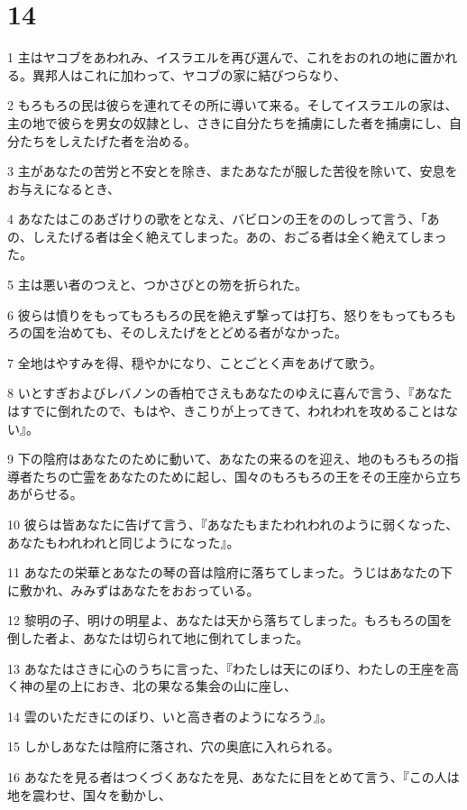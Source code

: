 \chapter{14}

\par 1 主はヤコブをあわれみ、イスラエルを再び選んで、これをおのれの地に置かれる。異邦人はこれに加わって、ヤコブの家に結びつらなり、
\par 2 もろもろの民は彼らを連れてその所に導いて来る。そしてイスラエルの家は、主の地で彼らを男女の奴隷とし、さきに自分たちを捕虜にした者を捕虜にし、自分たちをしえたげた者を治める。
\par 3 主があなたの苦労と不安とを除き、またあなたが服した苦役を除いて、安息をお与えになるとき、
\par 4 あなたはこのあざけりの歌をとなえ、バビロンの王をののしって言う、「あの、しえたげる者は全く絶えてしまった。あの、おごる者は全く絶えてしまった。
\par 5 主は悪い者のつえと、つかさびとの笏を折られた。
\par 6 彼らは憤りをもってもろもろの民を絶えず撃っては打ち、怒りをもってもろもろの国を治めても、そのしえたげをとどめる者がなかった。
\par 7 全地はやすみを得、穏やかになり、ことごとく声をあげて歌う。
\par 8 いとすぎおよびレバノンの香柏でさえもあなたのゆえに喜んで言う、『あなたはすでに倒れたので、もはや、きこりが上ってきて、われわれを攻めることはない』。
\par 9 下の陰府はあなたのために動いて、あなたの来るのを迎え、地のもろもろの指導者たちの亡霊をあなたのために起し、国々のもろもろの王をその王座から立ちあがらせる。
\par 10 彼らは皆あなたに告げて言う、『あなたもまたわれわれのように弱くなった、あなたもわれわれと同じようになった』。
\par 11 あなたの栄華とあなたの琴の音は陰府に落ちてしまった。うじはあなたの下に敷かれ、みみずはあなたをおおっている。
\par 12 黎明の子、明けの明星よ、あなたは天から落ちてしまった。もろもろの国を倒した者よ、あなたは切られて地に倒れてしまった。
\par 13 あなたはさきに心のうちに言った、『わたしは天にのぼり、わたしの王座を高く神の星の上におき、北の果なる集会の山に座し、
\par 14 雲のいただきにのぼり、いと高き者のようになろう』。
\par 15 しかしあなたは陰府に落され、穴の奥底に入れられる。
\par 16 あなたを見る者はつくづくあなたを見、あなたに目をとめて言う、『この人は地を震わせ、国々を動かし、
